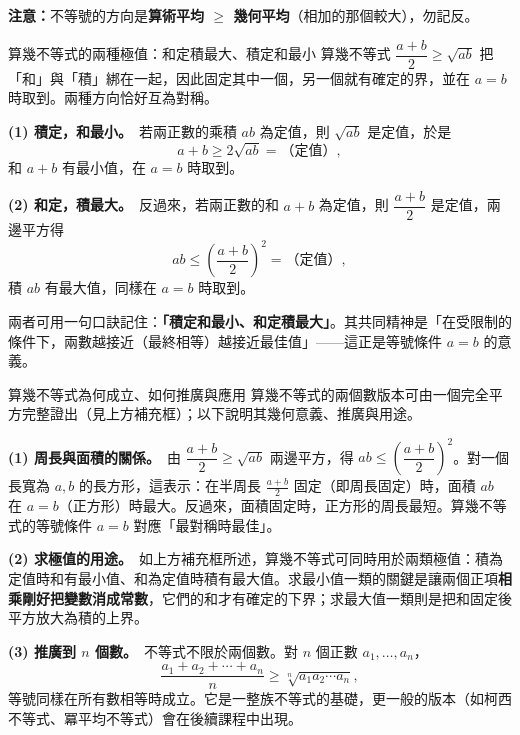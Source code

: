 \documentclass[11pt]{article}
\begin{document}

\textbf{注意：}不等號的方向是\textbf{算術平均 $\ge$ 幾何平均}（相加的那個較大），勿記反。

\begin{補充框}{算幾不等式的兩種極值：和定積最大、積定和最小}
算幾不等式 $\dfrac{a+b}{2}\ge\sqrt{ab}$ 把「和」與「積」綁在一起，因此固定其中一個，另一個就有確定的界，並在 $a=b$ 時取到。兩種方向恰好互為對稱。

\textbf{(1) 積定，和最小。}\ 若兩正數的乘積 $ab$ 為定值，則 $\sqrt{ab}$ 是定值，於是
$$a+b\ge2\sqrt{ab}=\text{（定值）},$$
和 $a+b$ 有最小值，在 $a=b$ 時取到。

\textbf{(2) 和定，積最大。}\ 反過來，若兩正數的和 $a+b$ 為定值，則 $\dfrac{a+b}{2}$ 是定值，兩邊平方得
$$ab\le\left(\frac{a+b}{2}\right)^2=\text{（定值）},$$
積 $ab$ 有最大值，同樣在 $a=b$ 時取到。

兩者可用一句口訣記住：\textbf{「積定和最小、和定積最大」}。其共同精神是「在受限制的條件下，兩數越接近（最終相等）越接近最佳值」——這正是等號條件 $a=b$ 的意義。
\end{補充框}


\begin{延伸框}{算幾不等式為何成立、如何推廣與應用}
算幾不等式的兩個數版本可由一個完全平方完整證出（見上方補充框）；以下說明其幾何意義、推廣與用途。

\textbf{(1) 周長與面積的關係。}\ 由 $\dfrac{a+b}{2}\ge\sqrt{ab}$ 兩邊平方，得 $ab\le\left(\dfrac{a+b}{2}\right)^2$。對一個長寬為 $a,b$ 的長方形，這表示：在半周長 $\frac{a+b}{2}$ 固定（即周長固定）時，面積 $ab$ 在 $a=b$（正方形）時最大。反過來，面積固定時，正方形的周長最短。算幾不等式的等號條件 $a=b$ 對應「最對稱時最佳」。

\textbf{(2) 求極值的用途。}\ 如上方補充框所述，算幾不等式可同時用於兩類極值：積為定值時和有最小值、和為定值時積有最大值。求最小值一類的關鍵是讓兩個正項\textbf{相乘剛好把變數消成常數}，它們的和才有確定的下界；求最大值一類則是把和固定後平方放大為積的上界。

\textbf{(3) 推廣到 $n$ 個數。}\ 不等式不限於兩個數。對 $n$ 個正數 $a_1,\dots,a_n$，
$$\frac{a_1+a_2+\cdots+a_n}{n}\ge\sqrt[n]{a_1a_2\cdots a_n},$$
等號同樣在所有數相等時成立。它是一整族不等式的基礎，更一般的版本（如柯西不等式、冪平均不等式）會在後續課程中出現。
\end{延伸框}
\end{document}
